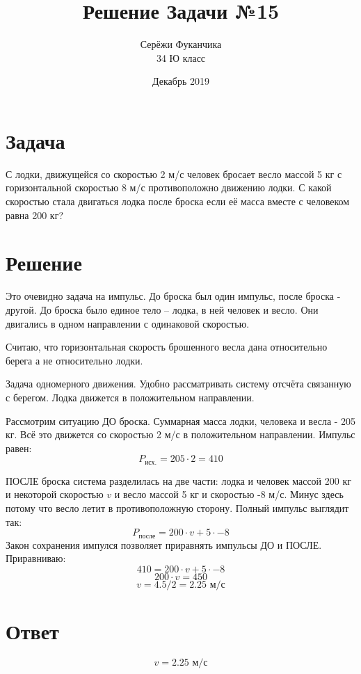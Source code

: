 \documentclass{article}
\title{Решение Задачи №15}
\author{Серёжи Фуканчика\\34 Ю класс}
\date{Декабрь 2019}
\begin{document}
\maketitle

\section{Задача}
С лодки, движущейся со скоростью 2 м/с человек бросает весло массой 5 кг с горизонтальной скоростью 8 м/с противоположно движению лодки. С какой скоростью стала двигаться лодка после броска если её масса вместе с человеком равна 200 кг?

\section{Решение}
Это очевидно задача на импульс. До броска был один импульс, после броска - другой. До броска было единое тело -- лодка, в ней человек и весло. Они двигались в одном направлении с одинаковой скоростью.

Считаю, что горизонтальная скорость брошенного весла дана относительно берега а не относительно лодки.

Задача одномерного движения. Удобно рассматривать систему отсчёта связанную с берегом. Лодка движется в положительном направлении.

Рассмотрим ситуацию ДО броска. Суммарная масса лодки, человека и весла - 205 кг. Всё это движется со скоростью 2 м/с в положительном направлении. Импульс равен:
$$P_{\textrm{исх.}}=205\cdot{}2=410$$

ПОСЛЕ броска система разделилась на две части: лодка и человек массой 200 кг и некоторой скоростью $v$ и весло массой 5 кг и скоростью -8 м/с. Минус здесь потому что весло летит в противоположную сторону. Полный импульс выглядит так:
$$P_{\textrm{после}}=200\cdot{}v+5\cdot-8$$
Закон сохранения импулся позволяет приравнять импульсы ДО и ПОСЛЕ. Приравниваю:
$$410=200\cdot{}v+5\cdot-8$$
$$200\cdot{}v=450$$
$$v=4.5/2=2.25 \textrm{ м/с}$$
\section{Ответ}
$$v=2.25 \textrm{ м/с}$$
\end{document}
